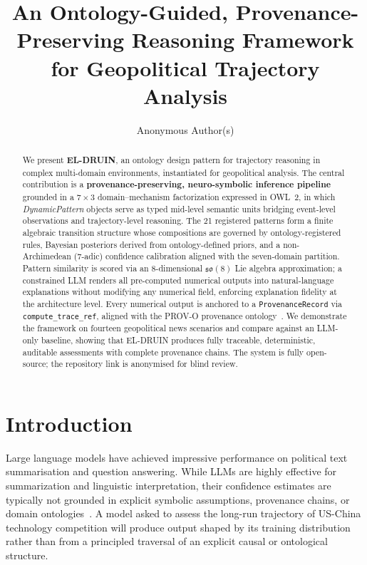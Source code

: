 \documentclass{llncs}
\title{An Ontology-Guided, Provenance-Preserving Reasoning Framework\\
for Geopolitical Trajectory Analysis}
\author{Anonymous Author(s)}
\institute{Anonymous Institution\\
\email{anonymous@review.blind}\\
\url{https://anonymous.4open.science/r/El-druin-F56D}}
\date{}
\begin{document}
\maketitle

\begin{abstract}
We present \textbf{EL-DRUIN}, an ontology design pattern for trajectory reasoning
in complex multi-domain environments, instantiated for geopolitical analysis.
The central contribution is a \textbf{provenance-preserving, neuro-symbolic inference
pipeline} grounded in a $7 \times 3$ domain--mechanism factorization expressed in
OWL~2, in which \emph{DynamicPattern} objects serve as typed mid-level semantic
units bridging event-level observations and trajectory-level reasoning.
The 21 registered patterns form a finite algebraic transition structure whose
compositions are governed by ontology-registered rules, Bayesian posteriors derived
from ontology-defined priors, and a non-Archimedean (7-adic) confidence calibration
aligned with the seven-domain partition.
Pattern similarity is scored via an 8-dimensional $\mathfrak{so}(8)$ Lie algebra
approximation; a constrained LLM renders all pre-computed numerical outputs into
natural-language explanations without modifying any numerical field, enforcing
explanation fidelity at the architecture level.
Every numerical output is anchored to a \texttt{ProvenanceRecord} via
\texttt{compute\_trace\_ref}, aligned with the PROV-O provenance ontology~\cite{w3c2013provo}.
We demonstrate the framework on fourteen geopolitical news scenarios and compare
against an LLM-only baseline, showing that EL-DRUIN produces fully traceable,
deterministic, auditable assessments with complete provenance chains.
The system is fully open-source; the repository link is anonymised for blind review.
\end{abstract}


\section{Introduction}

Large language models have achieved impressive performance on political
text summarisation and question answering. While LLMs are highly effective
for summarization and linguistic interpretation, their confidence estimates
are typically not grounded in explicit symbolic assumptions, provenance
chains, or domain ontologies~\cite{pan2023unifying}. A model asked to assess the
long-run trajectory of US-China technology competition will produce output
shaped by its training distribution rather than from a principled traversal
of an explicit causal or ontological structure.
\end{document}
